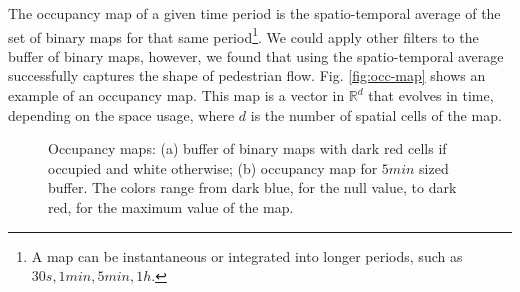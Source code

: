 The occupancy map of a given time period is the spatio-temporal average of the set of binary maps for that same period\footnote{A map can be instantaneous or integrated into longer periods, such as $30s, 1min, 5min, 1h.$}. 
We could apply other filters to the buffer of binary maps, however, we found that using the spatio-temporal average successfully captures the shape of pedestrian flow.
Fig. \ref{fig:occ-map} shows an example of an occupancy map. 
This map is a vector in $\mathbb{R}^{d}$ that evolves in time, depending on the space usage, where $d$ is the number of spatial cells of the map. 
\begin{figure}[hbt]
\centering
{}
\hspace{3mm}
\caption{Occupancy maps: (a) buffer of binary maps with dark red cells if occupied and white otherwise; (b) occupancy map for $5min$ sized buffer. The colors range from dark blue, for the null value, to dark red, for the maximum value of the map.}
\end{figure}
%
